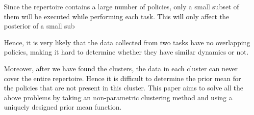 Since the repertoire contains a large number of policies, only a small subset of them will be executed while performing each task. 
This will only affect the posterior of a small sub

Hence, it is very likely that the data collected from two tasks have no overlapping policies, making it hard to determine whether they have similar dynamics or not.


Moreover, after we have found the clusters, the data in each cluster can never cover the entire repertoire. Hence it is difficult to determine the prior mean for the policies that are not present in this cluster.
This paper aims to solve all the above problems by taking an non-parametric clustering method and using a uniquely designed prior mean function.
